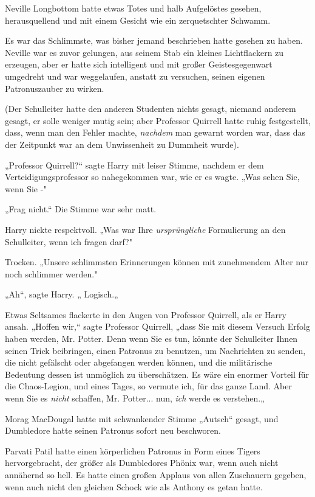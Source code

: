 {\hfill\break Neville Longbottom hatte etwas Totes und halb Aufgelöstes gesehen, herausquellend und mit einem Gesicht wie ein zerquetschter Schwamm.

Es war das Schlimmste, was bisher jemand beschrieben hatte gesehen zu haben. Neville war es zuvor gelungen, aus seinem Stab ein kleines Lichtflackern zu erzeugen, aber er hatte sich intelligent und mit großer Geistesgegenwart umgedreht und war weggelaufen, anstatt zu versuchen, seinen eigenen Patronuszauber zu wirken.

(Der Schulleiter hatte den anderen Studenten nichts gesagt, niemand anderem gesagt, er solle weniger mutig sein; aber Professor Quirrell hatte ruhig festgestellt, dass, wenn man den Fehler machte, \emph{nachdem} man gewarnt worden war, dass das der Zeitpunkt war an dem Unwissenheit zu Dummheit wurde).

„Professor Quirrell?“ sagte Harry mit leiser Stimme, nachdem er dem Verteidigungsprofessor so nahegekommen war, wie er es wagte. „Was sehen Sie, wenn Sie -"

„Frag nicht.“ Die Stimme war sehr matt.

Harry nickte respektvoll. „Was war Ihre \emph{ursprüngliche} Formulierung an den Schulleiter, wenn ich fragen darf?"

Trocken. „Unsere schlimmsten Erinnerungen können mit zunehmendem Alter nur noch schlimmer werden."

„Ah“, sagte Harry. „ Logisch.„

Etwas Seltsames flackerte in den Augen von Professor Quirrell, als er Harry ansah. „Hoffen wir,“ sagte Professor Quirrell, „dass Sie mit diesem Versuch Erfolg haben werden, Mr. Potter. Denn wenn Sie es tun, könnte der Schulleiter Ihnen seinen Trick beibringen, einen Patronus zu benutzen, um Nachrichten zu senden, die nicht gefälscht oder abgefangen werden können, und die militärische Bedeutung dessen ist unmöglich zu überschätzen. Es wäre ein enormer Vorteil für die Chaos-Legion, und eines Tages, so vermute ich, für das ganze Land. Aber wenn Sie es \emph{nicht} schaffen, Mr. Potter... nun, \emph{ich} werde es verstehen.„

\hfill\break Morag MacDougal hatte mit schwankender Stimme „Autsch“ gesagt, und Dumbledore hatte seinen Patronus sofort neu beschworen.

Parvati Patil hatte einen körperlichen Patronus in Form eines Tigers hervorgebracht, der größer als Dumbledores Phönix war, wenn auch nicht annähernd so hell. Es hatte einen großen Applaus von allen Zuschauern gegeben, wenn auch nicht den gleichen Schock wie als Anthony es getan hatte.

}
